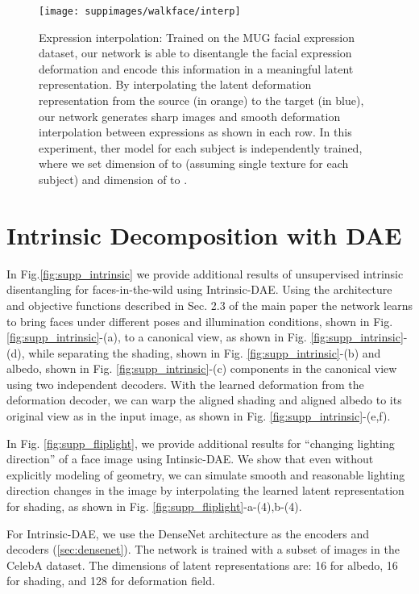 \documentclass[runningheads]{llncs}
\begin{document}
\begin{figure}[ht]
	\centering
	\texttt{[image: suppimages/walkface/interp]}
	\caption{Expression interpolation: Trained on the MUG facial expression dataset, our network is able to disentangle the facial expression
deformation and encode this information in a meaningful latent representation. By interpolating the latent deformation representation
from the source (in orange) to the target (in blue), our network generates sharp images and smooth deformation interpolation between
expressions as shown in each row. In this experiment, ther model for each subject is independently trained, where we set dimension of  to  (assuming single texture for each subject) and dimension of  to .  }
	\label{fig:supp_interp}
\end{figure}
\FloatBarrier

\section{Intrinsic Decomposition with DAE}

In Fig.\ref{fig:supp_intrinsic} we provide additional results  of unsupervised intrinsic disentangling for faces-in-the-wild using Intrinsic-DAE. Using the architecture and objective functions described in Sec. 2.3 of the main paper the network learns to bring faces under different poses and illumination conditions, shown in Fig. \ref{fig:supp_intrinsic}-(a), to a canonical view, as shown in Fig. \ref{fig:supp_intrinsic}-(d), while separating the shading, shown in Fig. \ref{fig:supp_intrinsic}-(b) and albedo, shown in Fig. \ref{fig:supp_intrinsic}-(c) components in the canonical view using two independent decoders. With the learned deformation from the deformation decoder, we can warp the aligned shading and aligned albedo to its original view as in the input image, as shown in Fig. \ref{fig:supp_intrinsic}-(e,f). 

In Fig. \ref{fig:supp_fliplight}, we provide additional results for ``changing lighting direction'' of a face image using Intinsic-DAE. We show that even without explicitly modeling of geometry, we can simulate smooth and reasonable lighting direction changes in the image by interpolating the learned latent representation for shading, as shown in Fig. \ref{fig:supp_fliplight}-a-(4),b-(4).

For Intrinsic-DAE, we use the DenseNet architecture as the encoders and decoders (\ref{sec:densenet}). The network is trained with a subset of  images in the CelebA dataset. The dimensions of latent representations are: 16 for albedo, 16 for shading, and 128 for deformation field.
 
\end{document}
